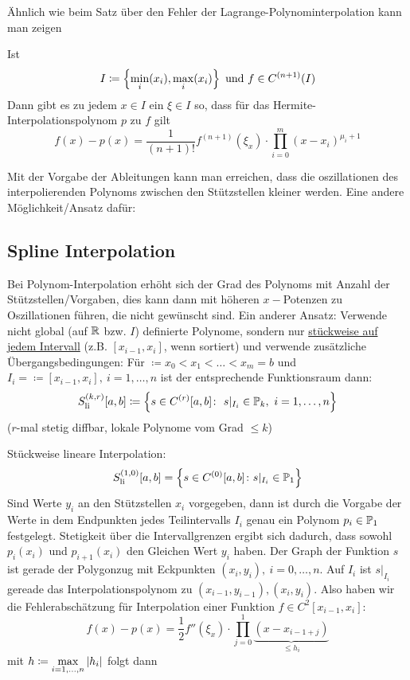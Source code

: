 \documentclass[../Skript.tex]{subfiles}
\begin{document}
Ähnlich wie beim Satz über den Fehler der Lagrange-Polynominterpolation kann man zeigen
\begin{theorem}
    Ist \[
    I \coloneqq \left\{ \min_i(x_i), \max_i(x_i) \right\} \text{ und } f\in C^{(n+1)}(I)
    \]
    Dann gibt es zu jedem $x\in I$ ein $\xi \in I$ so, dass für das Hermite-Interpolationspolynom $p$ zu $f$ gilt\[
    f(x) - p(x) = \frac{1}{(n+1)!}f^{(n+1)}(\xi_x) \cdot \prod_{i=0}^m (x-x_i)^{\mu_i + 1}
    \]
\end{theorem}
Mit der Vorgabe der Ableitungen kann man \typicherweise erreichen, dass die oszillationen des interpolierenden Polynoms
zwischen den Stützstellen kleiner werden. Eine andere Möglichkeit/Ansatz dafür:
\subsection{Spline Interpolation}
Bei Polynom-Interpolation erhöht sich der Grad des Polynoms mit Anzahl der Stützstellen/Vorgaben, dies kann dann mit 
höheren $x-$Potenzen zu Oszillationen führen, die nicht gewünscht sind. Ein anderer Ansatz:  Verwende nicht global (auf 
$\mathbb{R}$ bzw. $I$) definierte Polynome, sondern nur \underline{stückweise auf jedem Intervall} (z.B. $[x_{i-1},x_i]$, wenn 
sortiert) und verwende zusätzliche Übergangsbedingungen: Für $\coloneqq x_0<x_1<\dots<x_m=b$ und $I_i=\coloneqq[x_{i-
1},x_i], \ i=1,\dots,n$ ist der entsprechende Funktionsraum dann:\\
\[
    S_{\text{li}}^{(k,r)}[a,b] \coloneqq \left\{ s\in C^{(r)}[a,b]\colon\  s\vert_{I_i} \in \mathbb{P}_k, \ i=1,\dots,n  \right\}
\]
($r$-mal stetig diffbar, lokale Polynome vom Grad $\leq k$)


\begin{example}
    Stückweise lineare Interpolation: \[
    S_{\text{li}}^{(1,0)}[a,b] = \left\{ s\in C^{(0)}[a,b]\colon s\vert_{I_i}\in \mathbb{P}_1  \right\}
    \]
    Sind Werte $y_i$ an den Stützstellen $x_i$ vorgegeben, dann ist durch die Vorgabe der Werte in dem Endpunkten jedes 
    Teilintervalls $I_i$ genau ein Polynom $p_i\in\mathbb{P}_1$ festgelegt. Stetigkeit über die Intervallgrenzen ergibt sich 
    dadurch, dass sowohl $p_i(x_i)$ und $p_{i+1}(x_i)$ den Gleichen Wert $y_i$ haben. Der Graph der Funktion $s$ ist 
    gerade der Polygonzug mit Eckpunkten $(x_i, y_i),\ i=0,\dots, n$. Auf $I_i$ ist $s\vert_{I_i}$ gereade das 
    Interpolationspolynom zu $(x_{i-1}, y_{i-1}), (x_i, y_i)$. Also haben wir die Fehlerabschätzung für Interpolation einer
    Funktion $f\in C^2[x_{i-1}, x_i]:$\[
        f(x) - p(x) = \frac{1}{2}f''(\xi_x) \cdot \prod_{j=0}^1 \underset{\leq h_i}{\underbrace{(x-x_{i-1 + j})}}
    \] mit $h \coloneqq \max\limits_{i=1, \dots, n}\left\vert h_i \right\vert$ folgt dann
\end{example}
\end{document}
